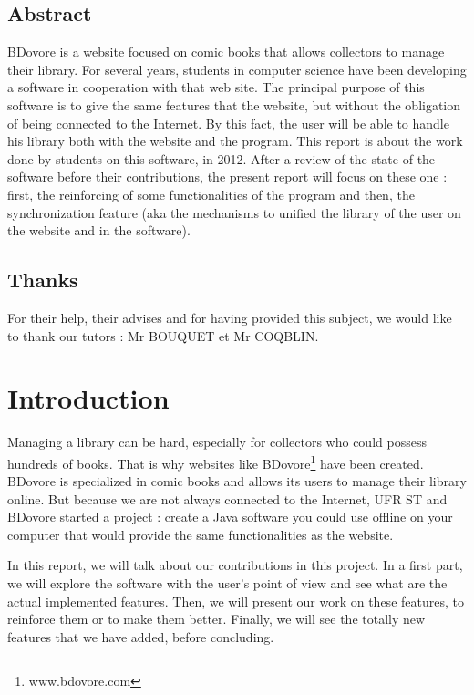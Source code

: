 \documentclass[11pt]{report} %
\begin{document}

\newpage

\section*{Abstract}
BDovore is a website focused on comic books that allows collectors to manage their library. For several years, students in computer science have been developing a software in cooperation with that web site. The principal purpose of this software is to give the same features that the website, but without the obligation of being connected to the Internet. By this fact, the user will be able to handle his library both with the website and the program.
\newline This report is about the work done by students on this software, in 2012.
After a review of the state of the software before their contributions, the present report will focus on these one : first, the reinforcing of some functionalities of the program and then, the synchronization feature (aka the mechanisms to unified the library of the user on the website and in the software).

\newpage

\section*{Thanks}
For their help, their advises and for having provided this subject, we would like to thank our tutors : Mr BOUQUET et Mr COQBLIN.
\newpage

\tableofcontents
\newpage

\chapter{Introduction}
Managing a library can be hard, especially for collectors who could possess hundreds of books. That is why websites like BDovore\footnote{www.bdovore.com} have been created. BDovore is specialized in comic books and allows its users to manage their library online. But because we are not always connected to the Internet, UFR ST and BDovore started a project : create a Java software you could use offline on your computer that would provide the same functionalities as the website.

In this report, we will talk about our contributions in this project. In a first part, we will explore the software with the user's point of view and see what are the actual implemented features. Then, we will present our work on these features, to reinforce them or to make them better. Finally, we will see the totally new features that we have added, before concluding.
\end{document}
